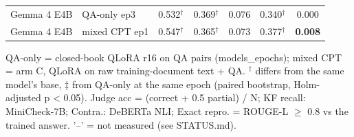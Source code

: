 \begin{table}[t]
{\begin{tabular}{llccccc}
Gemma 4 E4B & QA-only ep3 & 0.532$^\dagger$ & 0.369$^\dagger$ & 0.076 & 0.340$^\dagger$ & 0.000 \\
Gemma 4 E4B & mixed CPT ep1 & 0.547$^\dagger$ & 0.365$^\dagger$ & 0.073 & 0.377$^\dagger$ & \textbf{0.008} \\
\bottomrule
\end{tabular}}
\par\smallskip\footnotesize QA-only = closed-book QLoRA r16 on QA pairs (models\_epochs); mixed CPT = arm C, QLoRA on raw training-document text + QA. $^\dagger$ differs from the same model's base, ‡ from QA-only at the same epoch (paired bootstrap, Holm-adjusted p < 0.05). Judge acc = (correct + 0.5 partial) / N; KF recall: MiniCheck-7B; Contra.: DeBERTa NLI; Exact repro. = ROUGE-L $\geq$ 0.8 vs the trained answer. '–' = not measured (see STATUS.md).
\end{table}

